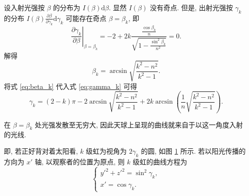 \documentclass{article}
\begin{document}
设入射光强按 $\beta$ 的分布为 $I\!\left(\beta\right)\mathrm d\beta$.
显然 $I\!\left(\beta\right)$ 没有奇点.
但是, 出射光强按 $\gamma_k$ 的分布 $I\!\left(\beta\right)\frac{\partial\beta}{\partial\gamma_k}\mathrm d\gamma_k$ 可能存在奇点 $\beta=\beta_k$,
即
\begin{equation}
	\left.\frac{\partial\gamma_k}{\partial\beta}\right|_{\beta=\beta_k}=-2+2k\frac{\frac{\cos\beta_k}n}{\sqrt{1-\frac{\sin^2\beta_k}{n^2}}}=0.
\end{equation}
解得
\begin{equation}
	\label{eq:beta_k}
	\beta_k=\arcsin\sqrt{\frac{k^2-n^2}{k^2-1}}.
\end{equation}
将式 \ref{eq:beta_k} 代入式 \ref{eq:gamma_k} 可得
\begin{equation}
	\gamma_k=\left(2-k\right)\pi-2\arcsin\sqrt{\frac{k^2-n^2}{k^2-1}}+2k\arcsin\left(\frac1n\sqrt{\frac{k^2-n^2}{k^2-1}}\right).
	\label{eq:完整的gamma_k}
\end{equation}

在 $\beta=\beta_k$ 处光强发散至无穷大, 因此天球上呈现的曲线就来自于以这一角度入射的光线.

\begin{figure}[h!]
	\centering
	\caption{}
	\label{fig:总光路图}
\end{figure}

即, 若正好背对着太阳看, $k$ 级虹为视角为 $2\gamma_k$ 的圆, 如图 \ref{fig:总光路图} 所示.
若以阳光传播的方向为 $x'$ 轴, 以观察者的位置为原点, 则 $k$ 级虹的曲线方程为
\begin{equation}
	\begin{cases}
		y'^2+z'^2=\sin^2\gamma_k,\\
		x'=\cos\gamma_k.
	\end{cases}
	\label{eq:换系前}
\end{equation}
\end{document}
